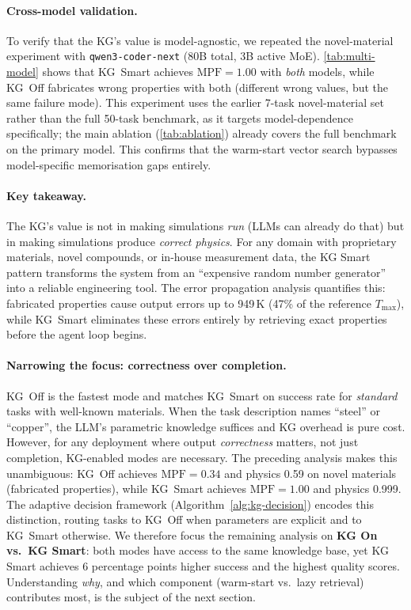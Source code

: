 \documentclass[preprint,review,12pt]{elsarticle}
\begin{document}
\paragraph{Cross-model validation.}
To verify that the KG's value is model-agnostic, we repeated the
novel-material experiment with \texttt{qwen3-coder-next} (80B total,
3B active MoE).  \cref{tab:multi-model} shows that KG~Smart achieves
$\text{MPF}{=}1.00$ with \emph{both} models, while KG~Off fabricates
wrong properties with both (different wrong values, but the same
failure mode).  This experiment uses the earlier 7-task novel-material
set rather than the full 50-task benchmark, as it targets
model-dependence specifically; the main ablation (\cref{tab:ablation})
already covers the full benchmark on the primary model.
This confirms that the warm-start vector search
bypasses model-specific memorisation gaps entirely.



\paragraph{Key takeaway.}
The KG's value is not in making simulations \emph{run} (LLMs can
already do that) but in making simulations produce
\emph{correct physics}.  For any domain with proprietary materials,
novel compounds, or in-house measurement data, the KG Smart pattern
transforms the system from an ``expensive random number generator''
into a reliable engineering tool.  The error propagation analysis
quantifies this: fabricated properties cause output errors up to
949\,K (47\% of the reference $T_{\max}$), while KG~Smart eliminates
these errors entirely by retrieving exact properties before the agent
loop begins.

\paragraph{Narrowing the focus: correctness over completion.}
KG~Off is the fastest mode and matches KG~Smart on success rate for
\emph{standard} tasks with well-known materials.  When the task
description names ``steel'' or ``copper'', the LLM's parametric
knowledge suffices and KG overhead is pure cost.  However, for any
deployment where output \emph{correctness} matters, not just
completion, KG-enabled modes are necessary.  The preceding analysis
makes this unambiguous: KG~Off achieves $\text{MPF}{=}0.34$ and
physics 0.59 on novel materials (fabricated properties), while
KG~Smart achieves $\text{MPF}{=}1.00$ and physics 0.999.
The adaptive decision framework (Algorithm~\ref{alg:kg-decision})
encodes this distinction, routing tasks to KG~Off when
parameters are explicit and to KG~Smart otherwise.  We therefore focus
the remaining analysis on \textbf{KG On vs.\ KG Smart}: both modes
have access to the same knowledge base, yet KG Smart achieves 6
percentage points higher success and the highest quality scores.
Understanding \emph{why}, and which component (warm-start vs.\ lazy
retrieval) contributes most, is the subject of the next section.
\end{document}
